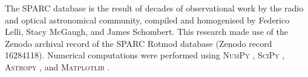 \documentclass{aa}
\begin{document}
\begin{acknowledgements}
The SPARC database is the result of decades of observational work by the radio
and optical astronomical community, compiled and homogenised by Federico Lelli,
Stacy McGaugh, and James Schombert. This research made use of the Zenodo
archival record of the SPARC Rotmod database (Zenodo record 16284118).
Numerical computations were performed using \textsc{NumPy} \citep{numpy},
\textsc{SciPy} \citep{scipy}, \textsc{Astropy} \citep{astropy},
and \textsc{Matplotlib} \citep{matplotlib}.
\end{acknowledgements}

\end{document}
